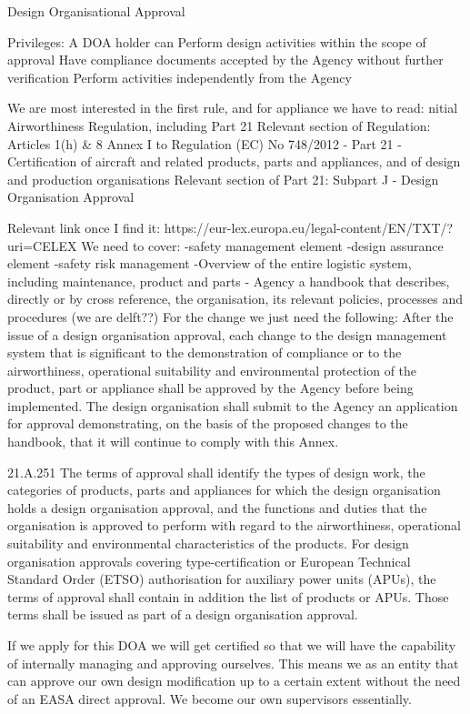 Design Organisational Approval

Privileges: A DOA holder can
Perform design activities within the scope of approval
Have compliance documents accepted by the Agency without further verification
Perform activities independently from the Agency

We are most interested in the first rule, and for appliance we have to read:
nitial Airworthiness Regulation, including Part 21
Relevant section of Regulation: Articles 1(h) & 8
Annex I to Regulation (EC) No 748/2012 - Part 21 - Certification of aircraft and related products, parts and appliances, and of design and production organisations
Relevant section of Part 21: Subpart J - Design Organisation Approval

Relevant link once I find it: https://eur-lex.europa.eu/legal-content/EN/TXT/?uri=CELEX%
We need to cover: 
-safety management element
-design assurance element
-safety risk management
-Overview of the entire logistic system, including maintenance, product and parts
- Agency a handbook that describes, directly or by cross reference, the organisation, its relevant policies, processes and procedures (we are delft??)
For the change we just need the following:
After the issue of a design organisation approval, each change to the design management system that is significant to the demonstration of compliance or to the airworthiness, operational suitability and environmental protection of the product, part or appliance shall be approved by the Agency before being implemented. The design organisation shall submit to the Agency an application for approval demonstrating, on the basis of the proposed changes to the handbook, that it will continue to comply with this Annex.

21.A.251 The terms of approval shall identify the types of design work, the categories of products, parts and appliances for which the design organisation holds a design organisation approval, and the functions and duties that the organisation is approved to perform with regard to the airworthiness, operational suitability and environmental characteristics of the products. For design organisation approvals covering type-certification or European Technical Standard Order (ETSO) authorisation for auxiliary power units (APUs), the terms of approval shall contain in addition the list of products or APUs. Those terms shall be issued as part of a design organisation approval.

If we apply for this DOA we will get certified so that we will have the capability of internally managing and approving ourselves. This means we as an entity that can approve our own design modification up to a certain extent without the need of an EASA direct approval. We become our own supervisors essentially. 

